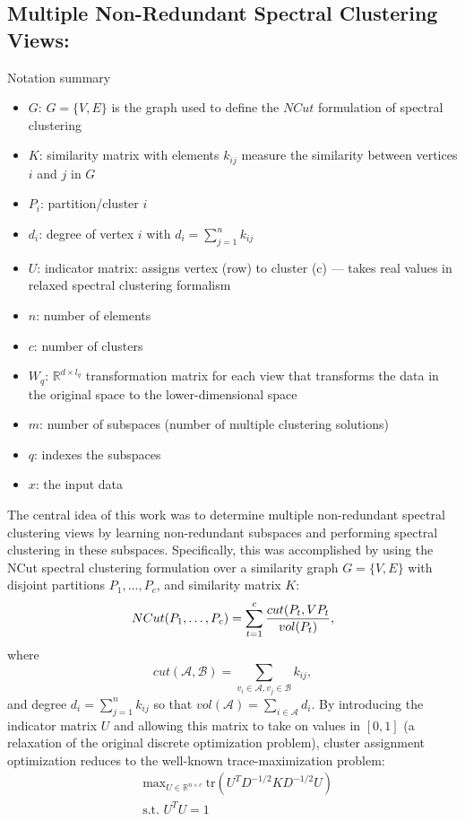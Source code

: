 \documentclass{article}
\numberwithin{equation}{section}
\numberwithin{thm}{section}
\begin{document}
\subsection{Multiple Non-Redundant Spectral Clustering Views: \citet{Niu2010}}
Notation summary
\begin{itemize}
\item $G$: $G=\{V,E\}$ is the graph used to define the $NCut$ formulation of spectral clustering
\item $K$: similarity matrix with elements $k_{ij}$ measure the similarity between vertices $i$ and $j$ in $G$
\item $P_i$: partition/cluster $i$
\item $d_i$: degree of vertex $i$ with $d_i = \sum_{j=1}^n k_{ij}$
\item $U$: indicator matrix: assigns vertex (row) to cluster (c) --- takes real values in relaxed spectral clustering formalism
\item $n$: number of elements
\item $c$: number of clusters
\item $W_q$: $\mathbb{R}^{d\times l_q}$ transformation matrix for each view that transforms the data in the original space to the lower-dimensional space
\item $m$: number of subspaces (number of multiple clustering solutions)
\item $q$: indexes the subspaces
\item $x$: the input data
\end{itemize}

The central idea of this work was to determine multiple non-redundant spectral clustering views by learning non-redundant subspaces and performing spectral clustering in these subspaces. Specifically, this was accomplished by using the NCut spectral clustering formulation over a similarity graph $G=\{V,E\}$ with disjoint partitions $P_1, \ldots, P_c$, and similarity matrix $K$:
$$
NCut(P_1, \ldots, P_c) = \sum_{t=1}^c \frac{cut(P_t, V\\P_t}{vol(P_t)},
$$
where
$$
cut(\mathcal{A}, \mathcal{B}) = \sum_{v_i \in \mathcal{A}, v_j \in \mathcal{B}} k_{ij},
$$
and degree $d_i = \sum_{j=1}^n k_{ij}$ so that $vol(\mathcal{A}) = \sum_{i \in \mathcal{A}} d_i$.
By introducing the indicator matrix $U$ and allowing this matrix to take on values in $[0,1]$ (a relaxation of the original discrete optimization problem), cluster assignment optimization reduces to the well-known trace-maximization problem:
\begin{align*}
& \text{max}_{U \in \mathbb{R}^{n \times c}} ~\text{tr}(U^TD^{-1/2}KD^{-1/2}U)\\
& \text{s.t. } U^TU = 1
\end{align*}
\end{document}
